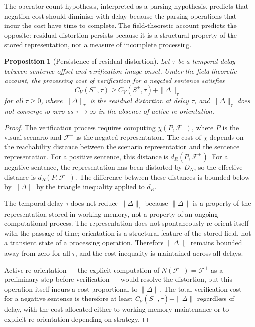 \documentclass[12pt]{article}
\newtheorem{proposition}[theorem]{Proposition}
\theoremstyle{remark}
\begin{document}
The operator-count hypothesis, interpreted as a parsing hypothesis,
predicts that negation cost should diminish with delay because the
parsing operations that incur the cost have time to complete. The
field-theoretic account predicts the opposite: residual distortion
persists because it is a structural property of the stored representation,
not a measure of incomplete processing.

\begin{proposition}[Persistence of residual distortion]
\label{prop:persistence}
Let $\tau$ be a temporal delay between sentence offset and verification
image onset. Under the field-theoretic account, the processing cost of
verification for a negated sentence satisfies
\[
C_V(S^-, \tau) \geq C_V(S^+, \tau) + \|\Delta\|_\tau
\]
for all $\tau \geq 0$, where $\|\Delta\|_\tau$ is the residual
distortion at delay $\tau$, and $\|\Delta\|_\tau$ does not converge to
zero as $\tau \to \infty$ in the absence of active re-orientation.
\end{proposition}
\begin{proof}
The verification process requires computing $\chi(P, \mathcal{F}^-)$,
where $P$ is the visual scenario and $\mathcal{F}^-$ is the negated
representation. The cost of $\chi$ depends on the reachability distance
between the scenario representation and the sentence representation. For
a positive sentence, this distance is $d_R(P, \mathcal{F}^+)$. For a
negative sentence, the representation has been distorted by $D_N$, so
the effective distance is $d_R(P, \mathcal{F}^-)$. The difference
between these distances is bounded below by $\|\Delta\|$ by the triangle
inequality applied to $d_R$.

The temporal delay $\tau$ does not reduce $\|\Delta\|_\tau$ because
$\|\Delta\|$ is a property of the representation stored in working
memory, not a property of an ongoing computational process. The
representation does not spontaneously re-orient itself with the passage
of time; orientation is a structural feature of the stored field, not a
transient state of a processing operation. Therefore $\|\Delta\|_\tau$
remains bounded away from zero for all $\tau$, and the cost inequality
is maintained across all delays.

Active re-orientation --- the explicit computation of $N(\mathcal{F}^-)
= \mathcal{F}^+$ as a preliminary step before verification --- would
resolve the distortion, but this operation itself incurs a cost
proportional to $\|\Delta\|$. The total verification cost for a negative
sentence is therefore at least $C_V(S^+, \tau) + \|\Delta\|$ regardless
of delay, with the cost allocated either to working-memory maintenance or
to explicit re-orientation depending on strategy.
\end{proof}
\end{document}
